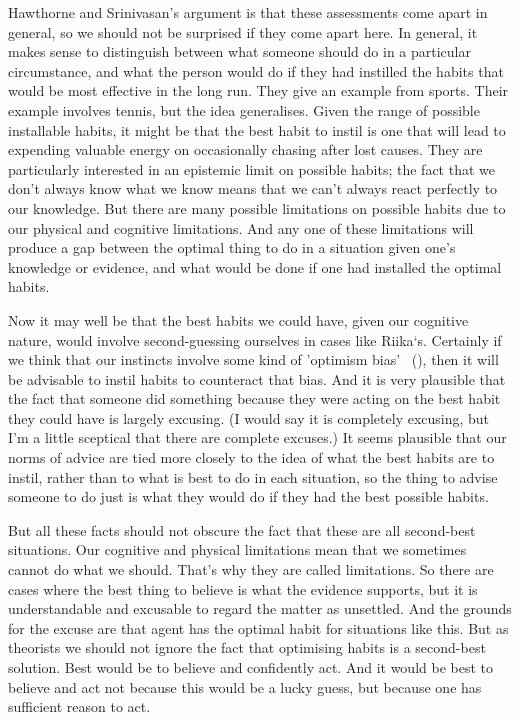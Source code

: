 \documentclass[
  10pt,
  letterpaper,
  twoside]{scrbook}
\begin{document}
Hawthorne and Srinivasan's argument is that these assessments come apart
in general, so we should not be surprised if they come apart here. In
general, it makes sense to distinguish between what someone should do in
a particular circumstance, and what the person would do if they had
instilled the habits that would be most effective in the long run. They
give an example from sports. Their example involves tennis, but the idea
generalises. Given the range of possible installable habits, it might be
that the best habit to instil is one that will lead to expending
valuable energy on occasionally chasing after lost causes. They are
particularly interested in an epistemic limit on possible habits; the
fact that we don't always know what we know means that we can't always
react perfectly to our knowledge. But there are many possible
limitations on possible habits due to our physical and cognitive
limitations. And any one of these limitations will produce a gap between
the optimal thing to do in a situation given one's knowledge or
evidence, and what would be done if one had installed the optimal
habits.

Now it may well be that the best habits we could have, given our
cognitive nature, would involve second-guessing ourselves in cases like
{Riika}`s. Certainly if we think that our instincts involve some kind of
'optimism bias' ~(), then it will
be advisable to instil habits to counteract that bias. And it is very
plausible that the fact that someone did something because they were
acting on the best habit they could have is largely excusing. (I would
say it is completely excusing, but I'm a little sceptical that there are
complete excuses.) It seems plausible that our norms of advice are tied
more closely to the idea of what the best habits are to instil, rather
than to what is best to do in each situation, so the thing to advise
someone to do just is what they would do if they had the best possible
habits.

But all these facts should not obscure the fact that these are all
second-best situations. Our cognitive and physical limitations mean that
we sometimes cannot do what we should. That's why they are called
limitations. So there are cases where the best thing to believe is what
the evidence supports, but it is understandable and excusable to regard
the matter as unsettled. And the grounds for the excuse are that agent
has the optimal habit for situations like this. But as theorists we
should not ignore the fact that optimising habits is a second-best
solution. Best would be to believe and confidently act. And it would be
best to believe and act not because this would be a lucky guess, but
because one has sufficient reason to act.
\end{document}
